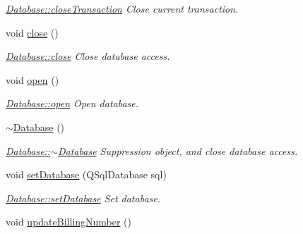 \begin{DoxyCompactItemize}
\begin{DoxyCompactList}\small\item\em \hyperlink{classDatabases_1_1Database_a56faa5446bd58e6b3c3a4c503d9309b1}{Database\-::close\-Transaction} Close current transaction. \end{DoxyCompactList}\item 
\hypertarget{classDatabases_1_1Database_a56127c397e3c424401d59d64cdb8e8fc}{void \hyperlink{classDatabases_1_1Database_a56127c397e3c424401d59d64cdb8e8fc}{close} ()}\label{classDatabases_1_1Database_a56127c397e3c424401d59d64cdb8e8fc}

\begin{DoxyCompactList}\small\item\em \hyperlink{classDatabases_1_1Database_a56127c397e3c424401d59d64cdb8e8fc}{Database\-::close} Close database access. \end{DoxyCompactList}\item 
\hypertarget{classDatabases_1_1Database_a53c4c277c2fbd3532d2bcaa1d47aed40}{void \hyperlink{classDatabases_1_1Database_a53c4c277c2fbd3532d2bcaa1d47aed40}{open} ()}\label{classDatabases_1_1Database_a53c4c277c2fbd3532d2bcaa1d47aed40}

\begin{DoxyCompactList}\small\item\em \hyperlink{classDatabases_1_1Database_a53c4c277c2fbd3532d2bcaa1d47aed40}{Database\-::open} Open database. \end{DoxyCompactList}\item 
\hypertarget{classDatabases_1_1Database_a457a2dac579f1ffc743f452a2dcbbd5c}{\hyperlink{classDatabases_1_1Database_a457a2dac579f1ffc743f452a2dcbbd5c}{$\sim$\-Database} ()}\label{classDatabases_1_1Database_a457a2dac579f1ffc743f452a2dcbbd5c}

\begin{DoxyCompactList}\small\item\em \hyperlink{classDatabases_1_1Database_a457a2dac579f1ffc743f452a2dcbbd5c}{Database\-::$\sim$\-Database} Suppression object, and close database access. \end{DoxyCompactList}\item 
void \hyperlink{classDatabases_1_1Database_a88af2050b210c0d829d166f0f6d9e318}{set\-Database} (Q\-Sql\-Database sql)
\begin{DoxyCompactList}\small\item\em \hyperlink{classDatabases_1_1Database_a88af2050b210c0d829d166f0f6d9e318}{Database\-::set\-Database} Set database. \end{DoxyCompactList}\item 
\hypertarget{classDatabases_1_1Database_a17b652086514e0a64d0e452a938ac7a5}{void \hyperlink{classDatabases_1_1Database_a17b652086514e0a64d0e452a938ac7a5}{update\-Billing\-Number} ()}\label{classDatabases_1_1Database_a17b652086514e0a64d0e452a938ac7a5}


\end{DoxyCompactItemize}
